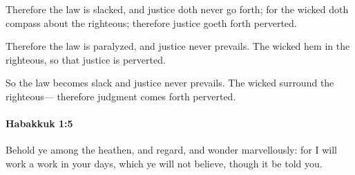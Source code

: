 			\begin{versebox}
					\item[BHS] 
					\item[LXX] 
					\item[ASV] Therefore the law is slacked, and justice doth never go forth; for the wicked doth compass about the righteous; therefore justice goeth forth perverted.
					\item[NIV] Therefore the law is paralyzed, and justice never prevails. The wicked hem in the righteous, so that justice is perverted.
					\item[NRSV] So the law becomes slack and justice never prevails. The wicked surround the righteous— therefore judgment comes forth perverted.
			\end{versebox}

		\paragraph{Habakkuk 1:5} %
			\label{HABAKKUK-1-5}

			Behold ye among the heathen, and regard, and wonder marvellously: for I will work a work in your days, which ye will not believe, though it be told you.

